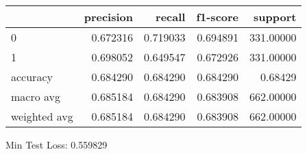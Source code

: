 \begin{tabular}{lrrrr}
\toprule
{} &  precision &    recall &  f1-score &    support \\
\midrule
0            &   0.672316 &  0.719033 &  0.694891 &  331.00000 \\
1            &   0.698052 &  0.649547 &  0.672926 &  331.00000 \\
accuracy     &   0.684290 &  0.684290 &  0.684290 &    0.68429 \\
macro avg    &   0.685184 &  0.684290 &  0.683908 &  662.00000 \\
weighted avg &   0.685184 &  0.684290 &  0.683908 &  662.00000 \\
\bottomrule
\end{tabular}

Min Test Loss: 0.559829
